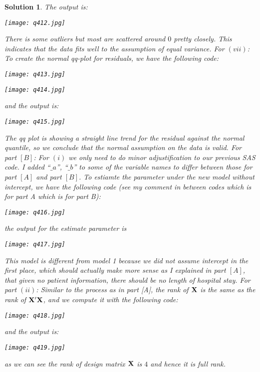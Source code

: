 \documentclass[11pt]{article}
\newtheorem{sol}{Solution}
\begin{document}
\begin{sol}
	The output is:
	\begin{center}
		\texttt{[image: q412.jpg]}
	\end{center}
	There is some outliers but most are scattered around $0$ pretty closely. This indicates that the data fits well to the assumption of equal variance.\vskip 2mm
	For $(vii)$:\vskip 2mm
	To create the normal qq-plot for residuals, we have the following code:
	\begin{center}
		\texttt{[image: q413.jpg]}
	\end{center}
	\begin{center}
		\texttt{[image: q414.jpg]}
	\end{center}
	and the output is:
	\begin{center}
		\texttt{[image: q415.jpg]}
	\end{center}
	The qq plot is showing a straight line trend for the residual against the normal quantile, so we conclude that the normal assumption on the data is valid.\vskip 2mm
	For part $[B]$:\vskip 2mm
	For $(i)$\vskip 2mm
	we only need to do minor adjustification to our previous SAS code. I added ``$\_a$'', ``$\_b$'' to some of the variable names to differ between those for part $[A]$ and part $[B]$.
	To estiamte the parameter under the new model without intercept, we have the following code (see my comment in between codes which is for part A which is for part B):
	\begin{center}
		\texttt{[image: q416.jpg]}
	\end{center}
	the output for the estimate parameter is
	\begin{center}
		\texttt{[image: q417.jpg]}
	\end{center}
	This model is different from model 1 because we did not assume intercept in the first place, which should actually make more sense as I explained in part $[A]$, that given no patient information, there should be no length of hospital stay.\vskip 2mm
	For part $(ii)$:\vskip 2mm
	Similar to the process as in part [A], the rank of ${\bf X}$ is the same as the rank of ${\bf X}'{\bf X}$, and we compute it with the following code:
	\begin{center}
		\texttt{[image: q418.jpg]}
	\end{center}
	and the output is:
	\begin{center}
		\texttt{[image: q419.jpg]}
	\end{center}
	as we can see the rank of design matrix ${\bf X}$ is $4$ and hence it is full rank.\vskip 2mm

\end{sol}
\end{document}
